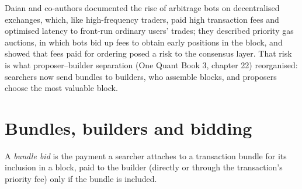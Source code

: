 Daian and co-authors documented the rise of arbitrage bots on decentralised exchanges, which, like high-frequency traders, paid high transaction
fees and optimised latency to front-run ordinary users' trades; they described priority gas auctions, in which bots bid up fees to obtain early
positions in the block, and showed that fees paid for ordering posed a risk to the consensus layer. That risk is what proposer--builder separation
(One Quant Book 3, chapter 22) reorganised: searchers now send bundles to builders, who assemble blocks, and proposers choose the most valuable
block.

\begin{omfigure}

\label{fig:hf:on-chain-trading:pipeline}
\end{omfigure}

\section{Bundles, builders and bidding}

\begin{definition}\label{def:hf:on-chain-trading:bid}
A \emph{bundle bid} is the payment a searcher attaches to a transaction bundle for its inclusion in a block, paid to the builder
(directly or through the transaction's priority fee) only if the bundle is included.
\end{definition}

